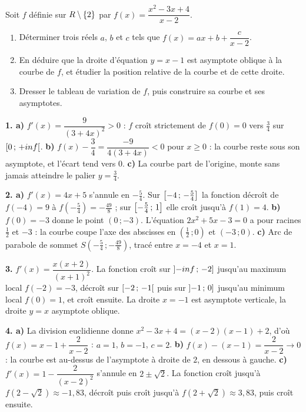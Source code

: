 \begin{annales}
Soit $f$ définie sur $R\setminus\{2\}$ par
$f(x) = \dfrac{x^{2}-3x+4}{x-2}$.
\begin{enumerate}[label=\textbf{\alph*)}, leftmargin=*, itemsep=0.15em]
  \item Déterminer trois réels $a$, $b$ et $c$ tels que
        $f(x) = ax+b+\dfrac{c}{x-2}$.
  \item En déduire que la droite d'équation $y = x-1$ est asymptote oblique à
        la courbe de $f$, et étudier la position relative de la courbe et de
        cette droite.
  \item Dresser le tableau de variation de $f$, puis construire sa courbe et
        ses asymptotes.
\end{enumerate}
\end{annales}

\begin{corrige}[annales]
\textbf{1. a)} $f'(x) = \dfrac{9}{(3+4x)^{2}} > 0$ : $f$ croît strictement de
$f(0) = 0$ vers $\frac34$ sur $\left[0\,;\,+inf\right[$.
\textbf{b)} $f(x)-\dfrac34 = \dfrac{-9}{4(3+4x)} < 0$ pour $x \geq 0$ : la
courbe reste sous son asymptote, et l'écart tend vers $0$.
\textbf{c)} La courbe part de l'origine, monte sans jamais atteindre le
palier $y = \frac34$.

\textbf{2. a)} $f'(x) = 4x+5$ s'annule en $-\frac54$. Sur
$\left[-4\,;\,-\frac54\right]$ la fonction décroît de $f(-4) = 9$ à
$f\left(-\frac54\right) = -\frac{49}{8}$ ; sur
$\left[-\frac54\,;\,1\right]$ elle croît jusqu'à $f(1) = 4$.
\textbf{b)} $f(0) = -3$ donne le point $(0\,;-3)$. L'équation
$2x^{2}+5x-3 = 0$ a pour racines $\frac12$ et $-3$ : la courbe coupe l'axe
des abscisses en $\left(\frac12\,;0\right)$ et $(-3\,;0)$.
\textbf{c)} Arc de parabole de sommet
$S\left(-\frac54\,;-\frac{49}{8}\right)$, tracé entre $x = -4$ et $x = 1$.

\textbf{3.} $f'(x) = \dfrac{x(x+2)}{(x+1)^{2}}$. La fonction croît sur
$\left]-inf\,;\,-2\right]$ jusqu'au maximum local $f(-2) = -3$, décroît sur
$\left[-2\,;\,-1\right[$ puis sur $\left]-1\,;\,0\right]$ jusqu'au minimum local
$f(0) = 1$, et croît ensuite. La droite $x = -1$ est asymptote verticale, la
droite $y = x$ asymptote oblique.

\textbf{4. a)} La division euclidienne donne
$x^{2}-3x+4 = (x-2)(x-1)+2$, d'où
$f(x) = x-1+\dfrac{2}{x-2}$ : $a = 1$, $b = -1$, $c = 2$.
\textbf{b)} $f(x)-(x-1) = \dfrac{2}{x-2} \to 0$ : la courbe est au-dessus de
l'asymptote à droite de $2$, en dessous à gauche.
\textbf{c)} $f'(x) = 1-\dfrac{2}{(x-2)^{2}}$ s'annule en $2\pm\sqrt2$. La
fonction croît jusqu'à $f\left(2-\sqrt2\right) \approx -1{,}83$, décroît puis
croît jusqu'à $f\left(2+\sqrt2\right) \approx 3{,}83$, puis croît ensuite.
\end{corrige}

